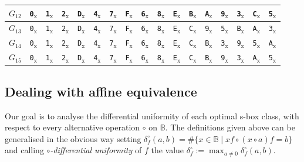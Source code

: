 \documentclass[runningheads,a4paper,english]{llncs}
\newcommand{\hex}[1]{\texttt{#1}$_\text{x}$}
\begin{document}
\begin{table}[]
\begin{tabular}{l||cccccccccccccccc|}
$G_{12}$&\hex{0}&\hex{1}&\hex{2}&\hex{D}&\hex{4}&\hex{7}&\hex{F}&\hex{6}&\hex{8}&\hex{E}&\hex{B}&\hex{A}&\hex{9}&\hex{3}&\hex{C}&\hex{5}\\\hline
$G_{13}$&\hex{0}&\hex{1}&\hex{2}&\hex{D}&\hex{4}&\hex{7}&\hex{F}&\hex{6}&\hex{8}&\hex{E}&\hex{C}&\hex{9}&\hex{5}&\hex{B}&\hex{A}&\hex{3}\\\hline
$G_{14}$&\hex{0}&\hex{1}&\hex{2}&\hex{D}&\hex{4}&\hex{7}&\hex{F}&\hex{6}&\hex{8}&\hex{E}&\hex{C}&\hex{B}&\hex{3}&\hex{9}&\hex{5}&\hex{A}\\\hline
$G_{15}$&\hex{0}&\hex{1}&\hex{2}&\hex{D}&\hex{4}&\hex{7}&\hex{F}&\hex{6}&\hex{8}&\hex{E}&\hex{C}&\hex{B}&\hex{9}&\hex{3}&\hex{A}&\hex{5}\\\hline
 	\end{tabular}
\end{table}


\subsection{Dealing with affine equivalence}
Our goal is to analyse the differential uniformity of each optimal s-box class, with respect to every alternative operation $\circ$ on $\mathbb B$. 
The definitions given above can be generalised in the obvious way setting
$\delta^\circ_f(a,b)=\#\{x \in \mathbb B \mid xf\circ (x\circ a)f=b\}$ and   calling \emph{$\circ$-differential uniformity} of $f$ the value
$\delta^\circ_f:=\max_{a\ne 0}\delta^\circ_f(a,b)$.
\end{document}
